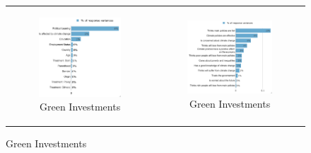 \documentclass{article}
\begin{document}
\begin{figure}[h!]
\begin{center}
	\caption{Variance decomposition LMG}
	\setlength\extrarowheight{-1pt}
	\begin{tabular}{cc}
		\begin{subfigure}{0.5\textwidth}
		\caption{Green Investments}
			\includegraphics[width=\textwidth]{lmg_investments_socio_non_standardized}
		\end{subfigure}&
		\begin{subfigure}{0.5\textwidth}
		\caption{Green Investments}
			\includegraphics[width=\textwidth]{lmg_investments_indices_non_standardized}
		\end{subfigure}\\
	\end{tabular}


\end{center}
\end{figure}
\end{document}
